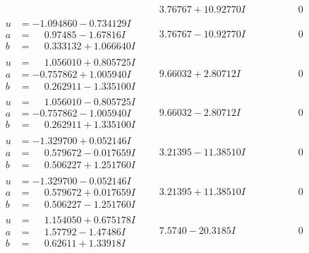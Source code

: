 \documentclass[1p]{elsarticle_modified}
\theoremstyle{definition}
\begin{document}
$$\begin{array}{c|c|c}
 & \phantom{-}3.76767 + 10.92770 I & \phantom{-0.000000 } 0 \\ \hline\begin{aligned}
u &= -1.094860 - 0.734129 I \\
a &= \phantom{-}0.97485 - 1.67816 I \\
b &= \phantom{-}0.333132 + 1.066640 I\end{aligned}
 & \phantom{-}3.76767 - 10.92770 I & \phantom{-0.000000 } 0 \\ \hline\begin{aligned}
u &= \phantom{-}1.056010 + 0.805725 I \\
a &= -0.757862 + 1.005940 I \\
b &= \phantom{-}0.262911 - 1.335100 I\end{aligned}
 & \phantom{-}9.66032 + 2.80712 I & \phantom{-0.000000 } 0 \\ \hline\begin{aligned}
u &= \phantom{-}1.056010 - 0.805725 I \\
a &= -0.757862 - 1.005940 I \\
b &= \phantom{-}0.262911 + 1.335100 I\end{aligned}
 & \phantom{-}9.66032 - 2.80712 I & \phantom{-0.000000 } 0 \\ \hline\begin{aligned}
u &= -1.329700 + 0.052146 I \\
a &= \phantom{-}0.579672 - 0.017659 I \\
b &= \phantom{-}0.506227 + 1.251760 I\end{aligned}
 & \phantom{-}3.21395 - 11.38510 I & \phantom{-0.000000 } 0 \\ \hline\begin{aligned}
u &= -1.329700 - 0.052146 I \\
a &= \phantom{-}0.579672 + 0.017659 I \\
b &= \phantom{-}0.506227 - 1.251760 I\end{aligned}
 & \phantom{-}3.21395 + 11.38510 I & \phantom{-0.000000 } 0 \\ \hline\begin{aligned}
u &= \phantom{-}1.154050 + 0.675178 I \\
a &= \phantom{-}1.57792 - 1.47486 I \\
b &= \phantom{-}0.62611 + 1.33918 I\end{aligned}
 & \phantom{-}7.5740 - 20.3185 I & \phantom{-0.000000 } 0 \\ \hline\begin{aligned}

\end{aligned}
\end{array}$$
\end{document}
